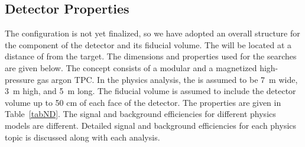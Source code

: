 \begin{table}[h]
    \begin{center}
        \end{center}
        \caption{\label{tabBC} Beam Power Configurations used for  and .}
    \end{table} 

\subsection{Detector Properties}
\label{sec:ndprops}

The  configuration is not yet finalized, so we have adopted an overall structure for the  component of the detector and its fiducial volume. %
The  will be located at a distance of \ndfromtarget from the target. The  dimensions and properties used for the  searches are given below.
The  concept %
consists of a modular \lartpc and a magnetized high-pressure gas argon TPC. In the  physics analysis, %
the  is assumed to be \SI{7}{m} wide, \SI{3}{m} high, and \SI{5}{m} long. The fiducial volume is assumed to include the detector volume up to 50 cm of each face of the detector.
The  properties are given in Table~\ref{tabND}. The signal and background efficiencies for different physics models are different. %
Detailed signal and background efficiencies for each physics topic is discussed along with each analysis.

